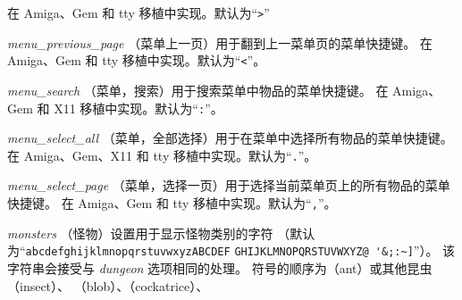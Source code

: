 \documentclass[a4paper, 10pt]{article}
\newcommand{\ib}[1]{\it #1 \hfill}
\begin{document}
在 Amiga、Gem 和 tty 移植中实现。默认为“\verb+>+”
\item[\ib{menu\_previous\_page}]
（菜单上一页）用于翻到上一菜单页的菜单快捷键。
在 Amiga、Gem 和 tty 移植中实现。默认为“\verb+<+”。
\item[\ib{menu\_search}]
（菜单，搜索）用于搜索菜单中物品的菜单快捷键。
在 Amiga、Gem 和 X11 移植中实现。默认为“{\tt :}”。
\item[\ib{menu\_select\_all}]
（菜单，全部选择）用于在菜单中选择所有物品的菜单快捷键。
在 Amiga、Gem、X11 和 tty 移植中实现。默认为“{\tt .}”。
\item[\ib{menu\_select\_page}]
（菜单，选择一页）用于选择当前菜单页上的所有物品的菜单快捷键。
在 Amiga、Gem 和 tty 移植中实现。默认为“{\tt ,}”。
\item[\ib{monsters}]
（怪物）设置用于显示怪物类别的字符
（默认为“\verb+abcdefghijklmnopqrstuvwxyzABCDEF+
\verb+GHIJKLMNOPQRSTUVWXYZ@ '&;:~]+”）。
该字符串会接受与 {\it dungeon\/} 选项相同的处理。
符号的顺序为\zhTransAnt（ant）或其他昆虫（insect）、
\zhTransBlobs（blob）、\zhTransCockatrice（cockatrice）、
\end{document}
